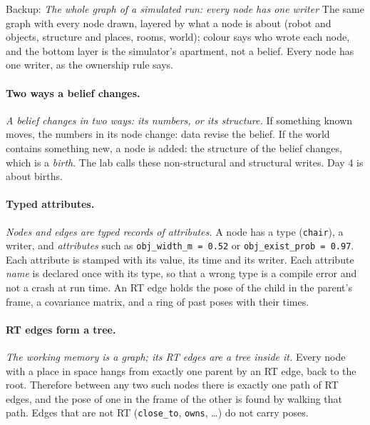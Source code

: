 \documentclass[11pt]{article}
\newcommand{\slt}[1]{\emph{#1}}   %
\begin{document}
\begin{backupbox}{Backup: \emph{The whole graph of a simulated run: every node has one writer}}
The same graph with every node drawn, layered by what a node is about (robot and objects, structure and places, rooms, world); colour says who wrote each node, and the bottom layer is the simulator's apartment, not a belief. Every node has one writer, as the ownership rule says.
\end{backupbox}

\paragraph{Two ways a belief changes.} \slt{A belief changes in two ways: its numbers, or its structure.} If something known moves, the numbers in its node change: data revise the belief. If the world contains something new, a node is added: the structure of the belief changes, which is a \emph{birth}. The lab calls these non-structural and structural writes. Day 4 is about births.

\paragraph{Typed attributes.} \slt{Nodes and edges are typed records of attributes.} A node has a type (\texttt{chair}), a writer, and \emph{attributes} such as \texttt{obj\_width\_m = 0.52} or \texttt{obj\_exist\_prob = 0.97}. Each attribute is stamped with its value, its time and its writer. Each attribute \emph{name} is declared once with its type, so that a wrong type is a compile error and not a crash at run time. An RT edge holds the pose of the child in the parent's frame, a covariance matrix, and a ring of past poses with their times.

\paragraph{RT edges form a tree.} \slt{The working memory is a graph; its RT edges are a tree inside it.} Every node with a place in space hangs from exactly one parent by an RT edge, back to the root. Therefore between any two such nodes there is exactly one path of RT edges, and the pose of one in the frame of the other is found by walking that path. Edges that are not RT (\texttt{close\_to}, \texttt{owns}, \ldots) do not carry poses.
\end{document}
